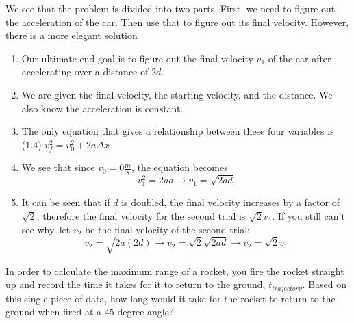 \begin{solution}
We see that the problem is divided into two parts. First, we need to figure out the acceleration of the car. Then use that to figure out its final velocity. However, there is a more elegant solution
\begin{enumerate}
    \item Our ultimate end goal is to figure out the final velocity $v_1$ of the car after accelerating over a distance of $2d$. 
    \item We are given the final velocity, the starting velocity, and the distance. We also know the acceleration is constant.
    \item The only equation that gives a relationship between these four variables is (1.4) $v_f^2 = v_0^2 + 2a\Delta x$
    \item We see that since $v_0 = 0\frac{m}{s}$, the equation becomes
    \begin{equation*}
        v_1^2 = 2ad \rightarrow
        v_1 = \sqrt{2ad}
    \end{equation*}
    \item It can be seen that if $d$ is doubled, the final velocity increases by a factor of $\sqrt{2}$, therefore the final velocity for the second trial is $\sqrt{2}v_1$. If you still can't see why, let $v_2$ be the final velocity of the second trial:
    \begin{equation*}
        v_2 = \sqrt{2a(2d)} \rightarrow
        v_2 = \sqrt{2}\sqrt{2ad} \rightarrow
        v_2 = \sqrt{2}v_1
    \end{equation*}
\end{enumerate}
\end{solution}


\begin{question}

In order to calculate the maximum range of a rocket, you fire the rocket straight up and record the time it takes for it to return to the ground, $t_{trajectory}$. Based on this single piece of data, how long would it take for the rocket to return to the ground when fired at a 45 degree angle?

\end{question}

